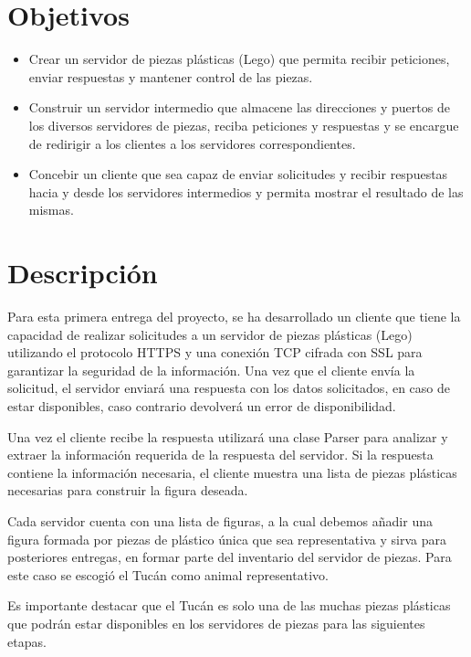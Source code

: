 \documentclass[a4paper,10pt]{article}
\begin{document}
	
	\section{Objetivos}	
	\begin{itemize}
	    \item Crear un servidor de piezas plásticas (Lego) que permita recibir peticiones, enviar respuestas y mantener control de las piezas.
	    \item Construir un servidor intermedio que almacene las direcciones y puertos de los diversos servidores de piezas, reciba peticiones y respuestas y se encargue de redirigir a los clientes a los servidores correspondientes.
	    \item Concebir un cliente que sea capaz de enviar solicitudes y recibir respuestas hacia y desde los servidores intermedios y permita mostrar el resultado de las mismas.
	\end{itemize}

	 \newpage

	\section{Descripción}
	Para esta primera entrega del proyecto, se ha desarrollado un cliente que tiene la capacidad de realizar solicitudes a un servidor de piezas plásticas (Lego) utilizando el protocolo HTTPS y una conexión TCP cifrada con SSL para garantizar la seguridad de la información.
	Una vez que el cliente envía la solicitud, el servidor enviará una respuesta con los datos solicitados, en caso de estar disponibles, caso contrario devolverá un error de disponibilidad.
 
	Una vez el cliente recibe la respuesta utilizará una clase Parser para analizar y extraer la información requerida de la respuesta del servidor. Si la respuesta contiene la información necesaria, el cliente muestra una lista de piezas plásticas necesarias para construir la figura deseada.
 
	Cada servidor cuenta con una lista de figuras, a la cual debemos añadir una figura formada por piezas de plástico única que sea representativa y sirva para posteriores entregas, en formar parte del inventario del servidor de piezas. Para este caso se escogió el Tucán como animal representativo.
 
	Es importante destacar que el Tucán es solo una de las muchas piezas plásticas que podrán estar disponibles en los servidores de piezas para las siguientes etapas.
\end{document}

